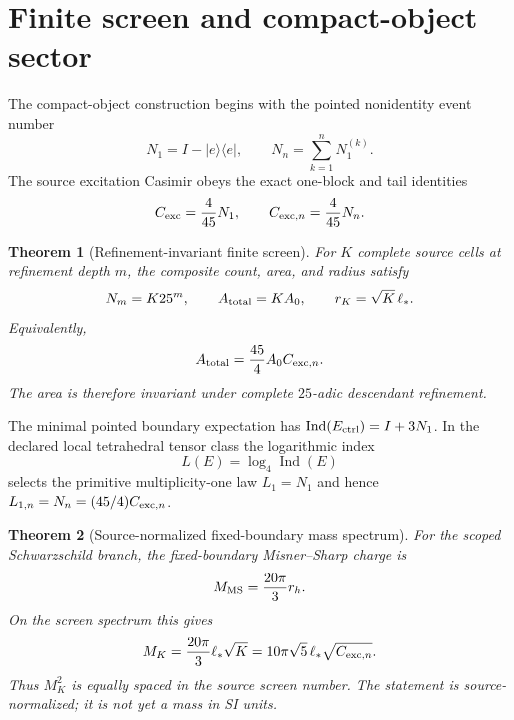 \documentclass[11pt]{article}
\newtheorem{theorem}{Theorem}[section]
\theoremstyle{definition}
\theoremstyle{remark}
\begin{document}
\section{Finite screen and compact-object sector}

The compact-object construction begins with the pointed nonidentity event
number
\begin{equation}
N_1=I-|e\rangle\!\langle e|,
\qquad
N_n=\sum_{k=1}^{n}N_1^{(k)}.
\label{eq:eventnumber}
\end{equation}
The source excitation Casimir obeys the exact one-block and tail identities
\begin{equation}
C_{\rm exc}=\frac4{45}N_1,
\qquad
C_{{\rm exc},n}=\frac4{45}N_n.
\label{eq:casimir-number}
\end{equation}

\begin{theorem}[Refinement-invariant finite screen]
For $K$ complete source cells at refinement depth $m$, the composite count,
area, and radius satisfy
\begin{equation}
N_m=K25^m,\qquad A_{\rm total}=K A_0,\qquad
r_K=\sqrt K\,\ell_*.
\label{eq:screen-refinement}
\end{equation}
Equivalently,
\begin{equation}
A_{\rm total}=\frac{45}{4}A_0 C_{{\rm exc},n}.
\end{equation}
The area is therefore invariant under complete $25$-adic descendant
refinement.
\end{theorem}

The minimal pointed boundary expectation has
$\operatorname{Ind}(E_{\rm ctrl})=I+3N_1$. In the declared local
tetrahedral tensor class the logarithmic index
\begin{equation}
L(E)=\log_4\operatorname{Ind}(E)
\end{equation}
selects the primitive multiplicity-one law $L_1=N_1$ and hence
$L_{1,n}=N_n=(45/4)C_{{\rm exc},n}$.

\begin{theorem}[Source-normalized fixed-boundary mass spectrum]
For the scoped Schwarzschild branch, the fixed-boundary Misner--Sharp charge
is
\begin{equation}
M_{\rm MS}=\frac{20\pi}{3}r_h.
\end{equation}
On the screen spectrum this gives
\begin{equation}
M_K=\frac{20\pi}{3}\ell_*\sqrt K
=10\pi\sqrt5\,\ell_*\sqrt{C_{{\rm exc},n}}.
\label{eq:screen-mass}
\end{equation}
Thus $M_K^2$ is equally spaced in the source screen number. The statement is
source-normalized; it is not yet a mass in SI units.
\end{theorem}
\end{document}
